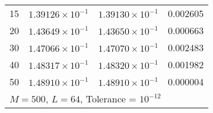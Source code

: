 \begin{table*}[!htbp]
\begin{tabular}{@{}cccc@{}}
15 & $1.39126 \times 10^{-1}$ & $1.39130 \times 10^{-1}$ & 0.002605 \\ 
20 & $1.43649 \times 10^{-1}$ & $1.43650 \times 10^{-1}$ & 0.000663 \\ 
30 & $1.47066 \times 10^{-1}$ & $1.47070 \times 10^{-1}$ & 0.002483 \\ 
40 & $1.48317 \times 10^{-1}$ & $1.48320 \times 10^{-1}$ & 0.001982 \\ 
50 & $1.48910 \times 10^{-1}$ & $1.48910 \times 10^{-1}$ & 0.000004 \\ 
\bottomrule
\multicolumn{4}{l}{$M = 500$, $L = 64$, Tolerance = $10^{-12}$} \\
\end{tabular}
\end{table*}

\begin{table}[!htbp]
	\caption{Transport Sweep Comparisons for Homogeneous Multiplying Slabs}
\end{table}
